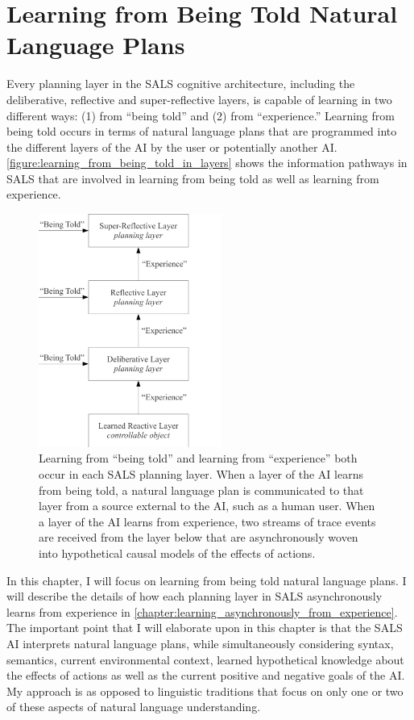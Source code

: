 \chapter{Learning from Being Told Natural Language Plans}
\label{chapter:learning_from_being_told}

Every planning layer in the SALS cognitive architecture, including the
deliberative, reflective and super-reflective layers, is capable of
learning in two different ways: (1) from ``being told'' and (2) from
``experience.''  Learning from being told occurs in terms of natural
language plans that are programmed into the different layers of the AI
by the user or potentially another AI.
{\mbox{\autoref{figure:learning_from_being_told_in_layers}}} shows the
information pathways in SALS that are involved in learning from being
told as well as learning from experience.
\begin{figure}
\centering
\includegraphics[width=6cm]{gfx/learning_from_being_told_in_layers}
\caption[Learning from ``being told'' and learning from ``experience''
  both occur in each SALS planning layer.]{Learning from ``being
  told'' and learning from ``experience'' both occur in each SALS
  planning layer.  When a layer of the AI learns from being told, a
  natural language plan is communicated to that layer from a source
  external to the AI, such as a human user.  When a layer of the AI
  learns from experience, two streams of trace events are received
  from the layer below that are asynchronously woven into hypothetical
  causal models of the effects of actions.}
\label{figure:learning_from_being_told_in_layers}
\end{figure}
In this chapter, I will focus on learning from being told natural
language plans.  I will describe the details of how each planning
layer in SALS asynchronously learns from experience in
{\mbox{\autoref{chapter:learning_asynchronously_from_experience}}}.
The important point that I will elaborate upon in this chapter is that
the SALS AI interprets natural language plans, while simultaneously
considering syntax, semantics, current environmental context, learned
hypothetical knowledge about the effects of actions as well as the
current positive and negative goals of the AI.  My approach is as
opposed to linguistic traditions that focus on only one or two of
these aspects of natural language understanding.


